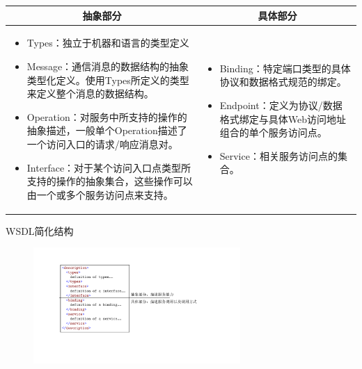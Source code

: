 \begin{solution}
\begin{spacing}{1.2}
    \begin{longtable}{|m{8.5cm}|m{6.5cm}|}
        \hline
        \multicolumn{1}{|c|}{\textbf{抽象部分}} & \multicolumn{1}{c|}{\textbf{具体部分}} \\ \hline
        \vspace{-1.3em}
        \begin{itemize}[leftmargin=1.5em,itemsep=-3pt]
            \item Types：独立于机器和语言的类型定义
            \item Message：通信消息的数据结构的抽象类型化定义。使用Types所定义的类型来定义整个消息的数据结构。  
            \item Operation：对服务中所支持的操作的抽象描述，一般单个Operation描述了一个访问入口的请求/响应消息对。
            \item Interface：对于某个访问入口点类型所支持的操作的抽象集合，这些操作可以由一个或多个服务访问点来支持。
        \vspace{-1.5em}
        \end{itemize}                                           
            & 
        \vspace{-1.3em}
        \begin{itemize}[leftmargin=1.5em,itemsep=-3pt]
            \item Binding：特定端口类型的具体协议和数据格式规范的绑定。
            \item Endpoint：定义为协议/数据格式绑定与具体Web访问地址组合的单个服务访问点。
            \item Service：相关服务访问点的集合。
        \vspace{-1.5em}
        \end{itemize}  
        \\ \hline
    \end{longtable}
    \vspace{-1em}
\end{spacing}

WSDL简化结构
\begin{figure}[H]
    \vspace{-0.7em}
	\centering
	\includegraphics[width=0.7\textwidth]{WSDL简化结构.pdf}
    \vspace{-1em}
\end{figure}


\end{solution}

